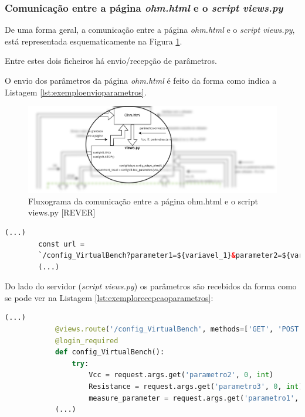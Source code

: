 \subsubsection{Comunicação entre a página \textit{ohm.html} e o \textit{script views.py}}
De uma forma geral, a comunicação entre a página \textit{ohm.html} e o \textit{script views.py}, está representada esquematicamente na Figura \ref{fig:fluxohmpormenor}.

Entre estes dois ficheiros há envio/recepção de parâmetros.

O envio dos parâmetros da página \textit{ohm.html} é feito da forma como indica a Listagem \ref{lst:exemploenvioparametros}.

\begin{figure}[hbtp]
	\centering
	\includegraphics[width=1\textwidth]{figures/ohm_diagrama_pormenor.drawio.png}
	\caption{Fluxograma da comunicação entre a página ohm.html e o script views.py [REVER]}
	\label{fig:fluxohmpormenor}
\end{figure}

\begin{center}
	\begin{minipage}{0.7\linewidth}
		\begin{lstlisting}[language=Html, caption=Exemplo de envio de parâmetros da página \textit{ohm.html} para o \textit{script views.py}, label=lst:exemploenvioparametros]
		(...)
		const url = 
		`/config_VirtualBench?parameter1=${variavel_1}&parameter2=${variavel2}&parameter3=${variavel3}`
		(...)
	\end{lstlisting}
	\end{minipage}
\end{center}

Do lado do servidor (\textit{script views.py}) os parâmetros são recebidos da forma como se pode ver na Listagem \ref{lst:exemplorecepcaoparametros}:
\begin{center}
	\begin{minipage}{1\linewidth}
		\begin{lstlisting}[language=Python, caption=Exemplo da recepção dos parâmetros no \textit{script views.py} enviados da página \textit{ohm.html}, label=lst:exemplorecepcaoparametros]
			(...)
			@views.route('/config_VirtualBench', methods=['GET', 'POST'])
			@login_required
			def config_VirtualBench():
				try:
					Vcc = request.args.get('parametro2', 0, int)
					Resistance = request.args.get('parametro3', 0, int)
					measure_parameter = request.args.get('parametro1', 0, str)
			(...)
		\end{lstlisting}
	\end{minipage}
\end{center}

